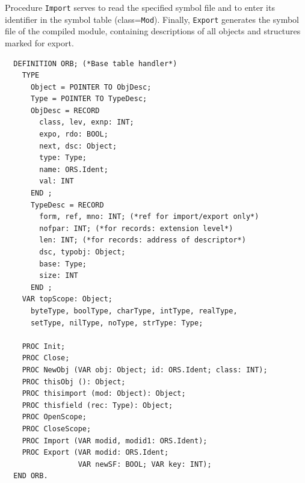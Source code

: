 Procedure \verb|Import| serves to read the specified symbol file and to enter its identifier in the
symbol table (class=\verb|Mod|). Finally, \verb|Export| generates the symbol file of the compiled
module, containing descriptions of all objects and structures marked for export.
\begin{verbatim}
  DEFINITION ORB; (*Base table handler*)
    TYPE
      Object = POINTER TO ObjDesc;
      Type = POINTER TO TypeDesc;
      ObjDesc = RECORD
        class, lev, exnp: INT;
        expo, rdo: BOOL;
        next, dsc: Object;
        type: Type;
        name: ORS.Ident;
        val: INT
      END ;
      TypeDesc = RECORD
        form, ref, mno: INT; (*ref for import/export only*)
        nofpar: INT; (*for records: extension level*)
        len: INT; (*for records: address of descriptor*)
        dsc, typobj: Object;
        base: Type;
        size: INT
      END ;
    VAR topScope: Object;
      byteType, boolType, charType, intType, realType,
      setType, nilType, noType, strType: Type;
  
    PROC Init;
    PROC Close;
    PROC NewObj (VAR obj: Object; id: ORS.Ident; class: INT);
    PROC thisObj (): Object;
    PROC thisimport (mod: Object): Object;
    PROC thisfield (rec: Type): Object;
    PROC OpenScope;
    PROC CloseScope;
    PROC Import (VAR modid, modid1: ORS.Ident);
    PROC Export (VAR modid: ORS.Ident;
                 VAR newSF: BOOL; VAR key: INT);
  END ORB.
\end{verbatim}

